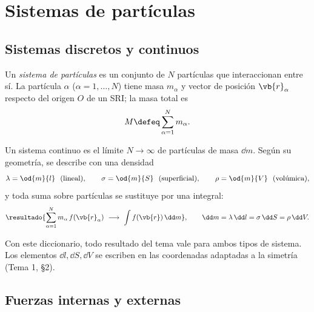 \section{Sistemas de partículas}
\label{sec:sistemas}

\subsection{Sistemas discretos y continuos}

\begin{definicion}
Un \emph{sistema de partículas} es un conjunto de $N$ partículas que
interaccionan entre sí. La partícula $\alpha$ ($\alpha=1,\dots,N$) tiene masa
$m_{\alpha}$ y vector de posición $\vb{r}_{\alpha}$ respecto del origen $O$ de un SRI;
la masa total es
\begin{equation}
  M\defeq\sa m_{\alpha}.
\end{equation}
\end{definicion}

\begin{definicion}
Un sistema continuo es el límite $N\to\infty$ de partículas de masa
$\dd m$. Según su geometría, se describe con una densidad
\begin{equation}
  \lambda=\od{m}{l}\ \ (\text{lineal}),\qquad
  \sigma=\od{m}{S}\ \ (\text{superficial}),\qquad
  \rho=\od{m}{V}\ \ (\text{volúmica}),
\end{equation}
y toda suma sobre partículas se sustituye por una integral:
\begin{equation}
  \resultado{\sa m_{\alpha}\,f(\vb{r}_{\alpha})\ \longrightarrow\ \int f(\vb{r})\,\dd m},
  \qquad \dd m=\lambda\,\dd l=\sigma\,\dd S=\rho\,\dd V .
  \label{eq:diccionario}
\end{equation}
\end{definicion}

Con este diccionario, todo resultado del tema vale para ambos tipos de
sistema. Los elementos $\dd l,\dd S,\dd V$ se escriben en las coordenadas
adaptadas a la simetría (Tema 1, \S2).

\subsection{Fuerzas internas y externas}

